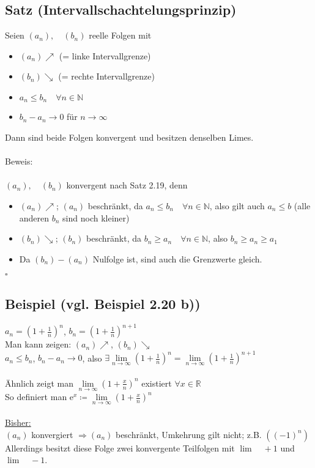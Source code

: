 \documentclass[12pt, titlepage]{article}
\newcommand{\R}{\mathds{R}}
\newcommand{\N}{\mathds{N}}
\newcommand{\e}{\textrm{e}}
\newcommand{\infn}{n\rightarrow\infty}
\renewcommand{\*}{\cdot}
\begin{document}
	\subsection{Satz (Intervallschachtelungsprinzip)}
	Seien $(a_n),\quad(b_n)$ reelle Folgen mit
	\begin{itemize}
		\item $(a_n)\nearrow$ (= linke Intervallgrenze)
		\item $(b_n)\searrow$ (= rechte Intervallgrenze)
		\item $a_n\leq b_n\quad\forall n\in\N$
		\item $b_n-a_n\rightarrow 0$ für $\infn$
	\end{itemize}
	Dann sind beide Folgen konvergent und besitzen denselben Limes.\\
	\\
	Beweis:\\
	\\
	$(a_n),\quad(b_n)$ konvergent nach Satz 2.19, denn
	\begin{itemize}
		\item $(a_n)\nearrow$; $(a_n)$ beschränkt, da $a_n\leq b_n\quad\forall n\in\N$, also gilt auch $a_n\leq b$ (alle anderen $b_n$ sind noch kleiner)
		\item $(b_n)\searrow$; $(b_n)$ beschränkt, da $b_n\geq a_n\quad\forall n\in\N$, also $b_n\geq a_n\geq a_1$
		\item Da $(b_n)-(a_n)$ Nulfolge ist, sind auch die Grenzwerte gleich.
	\end{itemize}\hfill$\square$
	\subsection{Beispiel (vgl. Beispiel 2.20 b))}
	$a_n=(1+\frac{1}{n})^n$, $b_n=(1+\frac{1}{n})^{n+1}$\\
	Man kann zeigen: $(a_n)\nearrow$, $(b_n)\searrow$\\
	$a_n\leq b_n$, $b_n-a_n\rightarrow 0$, also $\exists\lim\limits_{\infn}(1+\frac{1}{n})^n=\lim\limits_{\infn}(1+\frac{1}{n})^{n+1}$\\
	\\
	Ähnlich zeigt man $\lim\limits_{\infn}(1+\frac{x}{n})^n$ existiert $\forall x\in\R$\\
	So definiert man $\e^x\coloneqq\lim\limits_{\infn}(1+\frac{x}{n})^n$\\
	\\
	\underline{Bisher:}\\
	$(a_n)$ konvergiert $\Rightarrow (a_n)$ beschränkt, Umkehrung gilt nicht; z.B. $((-1)^n)$\\
	Allerdings besitzt diese Folge zwei konvergente Teilfolgen mit $\lim\quad+1$ und $\lim\quad-1$.
\end{document}
